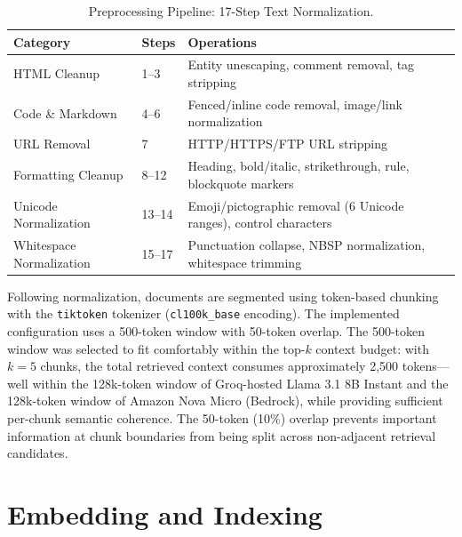 \begin{table}[H]
\caption{Preprocessing Pipeline: 17-Step Text Normalization.}
\label{tab:preprocess_steps}
\centering
\begin{tabular}{p{3.5cm}p{1.0cm}p{7.5cm}}
\toprule
\textbf{Category} & \textbf{Steps} & \textbf{Operations} \\
\midrule
HTML Cleanup & 1--3 & Entity unescaping, comment removal, tag stripping \\[2pt]
Code \& Markdown & 4--6 & Fenced/inline code removal, image/link normalization \\[2pt]
URL Removal & 7 & HTTP/HTTPS/FTP URL stripping \\[2pt]
Formatting Cleanup & 8--12 & Heading, bold/italic, strikethrough, rule, blockquote markers \\[2pt]
Unicode Normalization & 13--14 & Emoji/pictographic removal (6 Unicode ranges), control characters \\[2pt]
Whitespace Normalization & 15--17 & Punctuation collapse, NBSP normalization, whitespace trimming \\
\bottomrule
\end{tabular}
\end{table}

Following normalization, documents are segmented using token-based chunking with the \texttt{tiktoken} tokenizer (\texttt{cl100k\_base} encoding). The implemented configuration uses a 500-token window with 50-token overlap. The 500-token window was selected to fit comfortably within the top-$k$ context budget: with $k = 5$ chunks, the total retrieved context consumes approximately 2,500 tokens---well within the 128k-token window of Groq-hosted Llama 3.1 8B Instant and the 128k-token window of Amazon Nova Micro (Bedrock), while providing sufficient per-chunk semantic coherence. The 50-token (10\%) overlap prevents important information at chunk boundaries from being split across non-adjacent retrieval candidates.

\section{Embedding and Indexing}
\label{sec:embedding}

